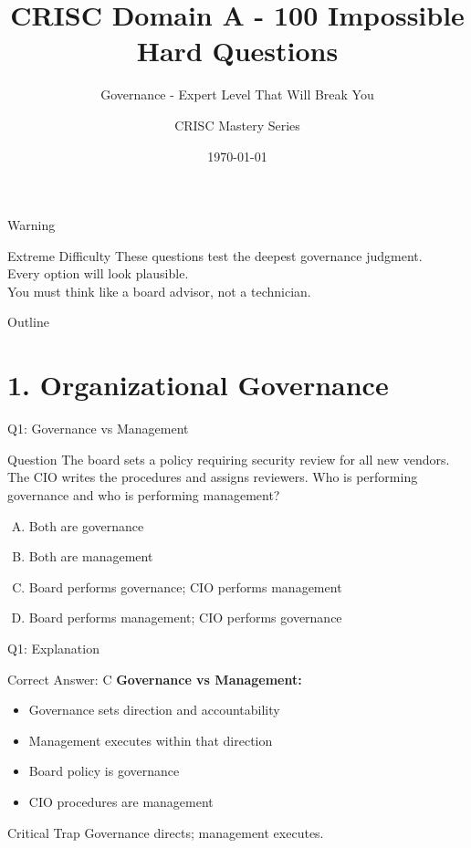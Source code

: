 \documentclass{beamer}
\title{CRISC Domain A - 100 Impossible Hard Questions}
\subtitle{Governance - Expert Level That Will Break You}
\author{CRISC Mastery Series}
\date{\today}
\begin{document}
	
	\begin{frame}
		\titlepage
	\end{frame}
	
	\begin{frame}{Warning}
		\begin{alertblock}{Extreme Difficulty}
			These questions test the deepest governance judgment.\\
			Every option will look plausible.\\
			You must think like a board advisor, not a technician.
		\end{alertblock}
	\end{frame}
	
	\begin{frame}{Outline}
		\tableofcontents
	\end{frame}
	
	\section{1. Organizational Governance}
	
	\begin{frame}{Q1: Governance vs Management}
		\begin{block}{Question}
			The board sets a policy requiring security review for all new vendors. The CIO writes the procedures and assigns reviewers. Who is performing governance and who is performing management?
		\end{block}
		\begin{enumerate}[(A)]
			\item Both are governance
			\item Both are management
			\item Board performs governance; CIO performs management
			\item Board performs management; CIO performs governance
		\end{enumerate}
	\end{frame}
	
	\begin{frame}{Q1: Explanation}
		\begin{block}{Correct Answer: C}
			\textbf{Governance vs Management:}
			\begin{itemize}
				\item Governance sets direction and accountability
				\item Management executes within that direction
				\item Board policy is governance
				\item CIO procedures are management
			\end{itemize}
		\end{block}
		\begin{alertblock}{Critical Trap}
			Governance directs; management executes.
		\end{alertblock}
	\end{frame}
	
\end{document}
